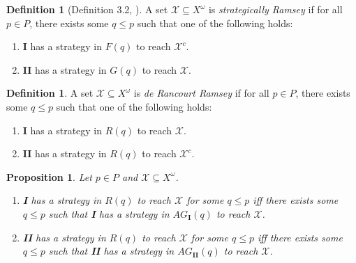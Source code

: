 \documentclass[11pt,reqno]{amsart}
\theoremstyle{plain}
\numberwithin{equation}{section}
\newtheorem{proposition}[theorem]{Proposition}
\theoremstyle{definition}
\newtheorem{definition}[theorem]{Definition}
\newcommand{\cal}{\mathcal}
\newcommand{\X}{\cal{X}}
\begin{document}
\begin{definition}[Definition 3.2, \cite{d20}]
    A set $\X \subseteq X^\omega$ is \emph{strategically Ramsey} if for all $p \in P$, there exists some $q \leq p$ such that one of the following holds:
    \begin{enumerate}
        \item \textbf{I} has a strategy in $F(q)$ to reach $\X^c$.

        \item \textbf{II} has a strategy in $G(q)$ to reach $\X$.
    \end{enumerate}
\end{definition}

\begin{definition}
    A set $\X \subseteq X^\omega$ is \emph{de Rancourt Ramsey} if for all $p \in P$, there exists some $q \leq p$ such that one of the following holds:
    \begin{enumerate}
        \item \textbf{I} has a strategy in $R(q)$ to reach $\X$.

        \item \textbf{II} has a strategy in $R(q)$ to reach $\X^c$.
    \end{enumerate}
\end{definition}

\begin{proposition}
\label{prop:rr.iff.ar}
    Let $p \in P$ and $\X \subseteq X^\omega$.
    \begin{enumerate}
        \item \textbf{I} has a strategy in $R(q)$ to reach $\X$ for some $q \leq p$ iff there exists some $q \leq p$ such that \textbf{I} has a strategy in $AG_\mathbf{I}(q)$ to reach $\X$.

        \item \textbf{II} has a strategy in $R(q)$ to reach $\X$ for some $q \leq p$ iff there exists some $q \leq p$ such that \textbf{II} has a strategy in $AG_\mathbf{II}(q)$ to reach $\X$.
    \end{enumerate}
\end{proposition}
\end{document}
